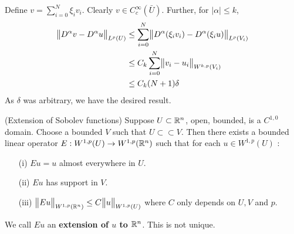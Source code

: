 \documentclass[12pt,a4paper]{report}
\newenvironment{proof}
{\begin{changemargin}{1cm}{0.5cm} 
	}%
	{\end{changemargin}
}
\begin{document}
\begin{proof}
\begin{itemize}
\quad Define $v = \sum_{i=0}^N \xi_i v_i$. Clearly $v \in C^{\infty}_c(\bar{U})$. Further, for $|\alpha|\leq k$,
\begin{align*}
\bigl\lVert D^{\alpha}v- D^{\alpha}u\bigr\rVert_{L^p(U)} &\leq \sum_{i=0}^N \bigl\lVert D^{\alpha}(\xi_i v_i) - D^{\alpha}(\xi_i u)\bigr\rVert_{L^p(V_i)} \\
&\leq C_k \sum_{i=0}^N \bigl\lVert v_i - u_i\bigr\rVert_{W^{k,p}(V_i)} \\
&\leq C_k (N+1)\delta
\end{align*}
As $\delta$ was arbitrary, we have the desired result.
\end{itemize}

\eop
\end{proof}
\s

\thm (Extension of Sobolev functions) Suppose $U\subset \mathbb{R}^n$, open, bounded, is a $C^{1,0}$ domain. Choose a bounded $V$ such that $U \subset\subset V$. Then there exists a bounded linear operator $E : W^{1,p}(U) \rightarrow W^{1,p}(\mathbb{R}^n)$ such that for each $u \in W^{1,p}(U)$ :
\begin{itemize}
\item[(i)] $Eu =u$ almost everywhere in $U$.
\item[(ii)] $Eu$ has support in $V$.
\item[(iii)] $\bigl\lVert Eu\bigr\rVert_{W^{1,p}(\mathbb{R}^n)} \leq C \bigl\lVert u\bigr\rVert_{W^{1,p}(U)}$ where $C$ only depends on $U,V$ and $p$.
\end{itemize}
\s

We call $Eu$ an \textbf{extension of $u$ to $\mathbb{R}^n$}. This is not unique.
\s
\end{document}
